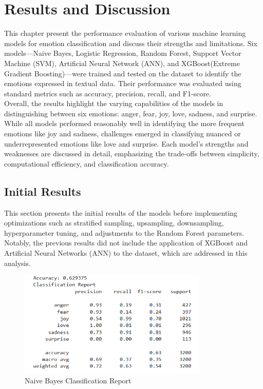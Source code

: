 \section{Results and Discussion}
This chapter present the performance evaluation of various machine learning models for emotion classification and discuss their strengths and limitations. Six models—Naive Bayes, Logistic Regression, Random Forest, Support Vector Machine (SVM), Artificial Neural Network (ANN), and XGBoost(Extreme Gradient Boosting)—were trained and tested on the dataset to identify the emotions expressed in textual data. Their performance was evaluated using standard metrics such as accuracy, precision, recall, and F1-score.\\

Overall, the results highlight the varying capabilities of the models in distinguishing between six emotions: anger, fear, joy, love, sadness, and surprise. While all models performed reasonably well in identifying the more frequent emotions like joy and sadness, challenges emerged in classifying nuanced or underrepresented emotions like love and surprise. Each model's strengths and weaknesses are discussed in detail, emphasizing the trade-offs between simplicity, computational efficiency, and classification accuracy.\\

\subsection{Initial Results}
This section presents the initial results of the models before implementing optimizations such as stratified sampling, upsampling, downsampling, hyperparameter tuning, and adjustments to the Random Forest parameters. Notably, the previous results did not include the application of XGBoost and Artificial Neural Networks (ANN) to the dataset, which are addressed in this analysis.\\

\begin{figure}[h!]
	\centering
	\includegraphics[width=0.8\textwidth]{init_result_naive_bayes.png}
	\caption{Naive Bayes Classification Report}
	\label{fig:initial_naive_bayes}
\end{figure}

